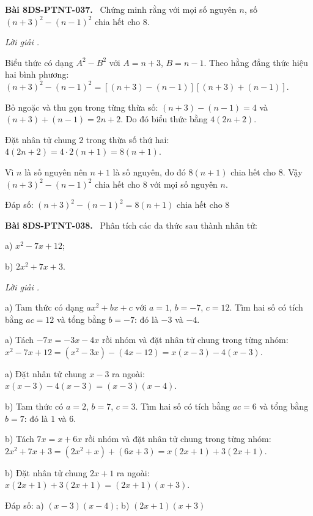 \documentclass[12pt,a4paper]{article}
\newenvironment{problem}[1][]{\par\medskip\noindent\textbf{Bài #1.}\ }{\par}
\newenvironment{solution}[1][]{\par\noindent\textit{Lời giải #1.}\par}{\par}
\begin{document}
\begin{problem}[8DS-PTNT-037]
Chứng minh rằng với mọi số nguyên $n$, số $(n + 3)^2 - (n - 1)^2$ chia hết cho $8$.

\begin{solution}
Biểu thức có dạng $A^2 - B^2$ với $A = n + 3$, $B = n - 1$. Theo hằng đẳng thức hiệu hai bình phương: $(n + 3)^2 - (n - 1)^2 = \left[(n + 3) - (n - 1)\right]\left[(n + 3) + (n - 1)\right]$.

Bỏ ngoặc và thu gọn trong từng thừa số: $(n + 3) - (n - 1) = 4$ và $(n + 3) + (n - 1) = 2n + 2$. Do đó biểu thức bằng $4(2n + 2)$.

Đặt nhân tử chung $2$ trong thừa số thứ hai: $4(2n + 2) = 4 \cdot 2(n + 1) = 8(n + 1)$.

Vì $n$ là số nguyên nên $n + 1$ là số nguyên, do đó $8(n + 1)$ chia hết cho $8$. Vậy $(n + 3)^2 - (n - 1)^2$ chia hết cho $8$ với mọi số nguyên $n$.

Đáp số: $\boxed{(n + 3)^2 - (n - 1)^2 = 8(n + 1) \text{ chia hết cho } 8}$
\end{solution}
\end{problem}

\begin{problem}[8DS-PTNT-038]
Phân tích các đa thức sau thành nhân tử:

a) $x^2 - 7x + 12$;

b) $2x^2 + 7x + 3$.

\begin{solution}
a) Tam thức có dạng $ax^2 + bx + c$ với $a = 1$, $b = -7$, $c = 12$. Tìm hai số có tích bằng $ac = 12$ và tổng bằng $b = -7$: đó là $-3$ và $-4$.

a) Tách $-7x = -3x - 4x$ rồi nhóm và đặt nhân tử chung trong từng nhóm: $x^2 - 7x + 12 = (x^2 - 3x) - (4x - 12) = x(x - 3) - 4(x - 3)$.

a) Đặt nhân tử chung $x - 3$ ra ngoài: $x(x - 3) - 4(x - 3) = (x - 3)(x - 4)$.

b) Tam thức có $a = 2$, $b = 7$, $c = 3$. Tìm hai số có tích bằng $ac = 6$ và tổng bằng $b = 7$: đó là $1$ và $6$.

b) Tách $7x = x + 6x$ rồi nhóm và đặt nhân tử chung trong từng nhóm: $2x^2 + 7x + 3 = (2x^2 + x) + (6x + 3) = x(2x + 1) + 3(2x + 1)$.

b) Đặt nhân tử chung $2x + 1$ ra ngoài: $x(2x + 1) + 3(2x + 1) = (2x + 1)(x + 3)$.

Đáp số: a) $\boxed{(x - 3)(x - 4)}$; b) $\boxed{(2x + 1)(x + 3)}$
\end{solution}
\end{problem}
\end{document}
